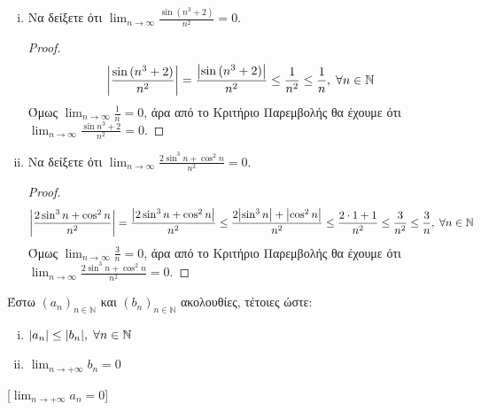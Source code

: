 \begin{examples}
\item {}
  \begin{enumerate}[i)]
    \item Να δείξετε ότι $ \lim_{n \to \infty} \frac{\sin{(n^{3}+2)}}{n^{2}} = 0 $. 
      \begin{proof}
        \[
          \abs{\frac{\sin{(n^{3}+2)}}{n^{2}}} = \frac{\abs{\sin{(n^{3}+2)}}}{n^{2}} \leq
          \frac{1}{n^{2}} \leq \frac{1}{n} , \; \forall n \in \mathbb{N}
        \] 
        Όμως $ \lim_{n \to \infty} \frac{1}{n} = 0 $, άρα από το Κριτήριο Παρεμβολής θα
        έχουμε ότι $ \lim_{n \to \infty} \frac{\sin{n^{3}+2}}{n^{2}} = 0 $.
      \end{proof}

    \item Να δείξετε ότι $ \lim_{n \to \infty} \frac{2 \sin^{3}{n} + 
      \cos^{2}{n}}{n^{2}} =0 $.  
      \begin{proof} 
        \[
          \abs{\frac{2 \sin^{3}{n} +\cos^{2}{n}}{n^{2}}} = \frac{\abs{2 \sin^{3}{n}
            + \cos^{2}{n}}}{n^{2}} \leq \frac{2 \abs{\sin^{3}{n}}+ 
          \abs{\cos^{2}{n}}}{n^{2}} \leq \frac{2\cdot 1 + 1}{n^{2}} \leq
          \frac{3}{n^{2}} \leq \frac{3}{n} ,  
          \; \forall n \in \mathbb{N}
        \] 
        Όμως $ \lim_{n \to \infty} \frac{3}{n} = 0 $, άρα από το Κριτήριο Παρεμβολής θα
        έχουμε ότι $ \lim_{n \to \infty} \frac{2 \sin^{3}{n} + 
        \cos^{2}{n}}{n^{2}} = 0 $.
      \end{proof}

  \end{enumerate}
\end{examples}

\begin{cor}
  Έστω $ (a_{n})_{n \in \mathbb{N}} $ και $ 
  (b_{n})_{n \in \mathbb{N}} $ ακολουθίες, τέτοιες ώστε: 

  \vspace{\baselineskip}

  \begin{minipage}{0.25\textwidth}
    \begin{enumerate}[i)]
      \item $ \abs{a_{n}} \leq \abs{b_{n}}, \; \forall n \in 
        \mathbb{N} $ \hfill {}
      \item $ \lim_{n \to +\infty} b_{n} = 0$ \hfill {}
    \end{enumerate}
  \end{minipage}

  [$ \lim_{n \to +\infty} a_{n} = 0 $]
\end{cor}

